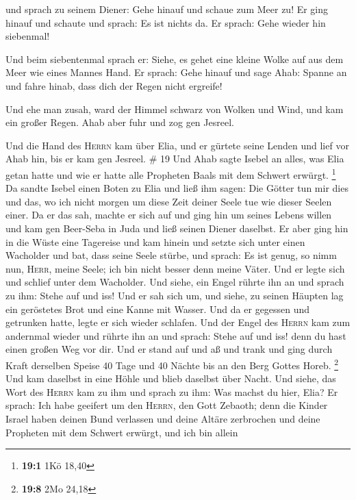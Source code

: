  und sprach zu seinem Diener: Gehe hinauf und schaue zum
Meer zu! Er ging hinauf und schaute und sprach: Es ist nichts da. Er
sprach: Gehe wieder hin siebenmal!

 Und beim siebentenmal sprach er: Siehe, es gehet eine
kleine Wolke auf aus dem Meer wie eines Mannes Hand. Er sprach: Gehe
hinauf und sage Ahab: Spanne an und fahre hinab, dass dich der Regen
nicht ergreife!

 Und ehe man zusah, ward der Himmel schwarz von Wolken
und Wind, und kam ein großer Regen. Ahab aber fuhr und zog gen Jesreel.

 Und die Hand des \textsc{Herrn} kam über Elia, und er
gürtete seine Lenden und lief vor Ahab hin, bis er kam gen Jesreel. \#
19  Und Ahab sagte Isebel an alles, was Elia getan hatte
und wie er hatte alle Propheten Baals mit dem Schwert erwürgt.
\footnote{\textbf{19:1} 1Kö 18,40}  Da sandte Isebel einen
Boten zu Elia und ließ ihm sagen: Die Götter tun mir dies und das, wo
ich nicht morgen um diese Zeit deiner Seele tue wie dieser Seelen einer.
 Da er das sah, machte er sich auf und ging hin um seines
Lebens willen und kam gen Beer-Seba in Juda und ließ seinen Diener
daselbst.  Er aber ging hin in die Wüste eine Tagereise
und kam hinein und setzte sich unter einen Wacholder und bat, dass seine
Seele stürbe, und sprach: Es ist genug, so nimm nun, \textsc{Herr},
meine Seele; ich bin nicht besser denn meine Väter.  Und
er legte sich und schlief unter dem Wacholder. Und siehe, ein Engel
rührte ihn an und sprach zu ihm: Stehe auf und iss!  Und
er sah sich um, und siehe, zu seinen Häupten lag ein geröstetes Brot und
eine Kanne mit Wasser. Und da er gegessen und getrunken hatte, legte er
sich wieder schlafen.  Und der Engel des \textsc{Herrn}
kam zum andernmal wieder und rührte ihn an und sprach: Stehe auf und
iss! denn du hast einen großen Weg vor dir.  Und er stand
auf und aß und trank und ging durch Kraft derselben Speise 40 Tage und
40 Nächte bis an den Berg Gottes Horeb. \footnote{\textbf{19:8} 2Mo
  24,18}  Und kam daselbst in eine Höhle und blieb
daselbst über Nacht. Und siehe, das Wort des \textsc{Herrn} kam zu ihm
und sprach zu ihm: Was machst du hier, Elia?  Er sprach:
Ich habe geeifert um den \textsc{Herrn}, den Gott Zebaoth; denn die
Kinder Israel haben deinen Bund verlassen und deine Altäre zerbrochen
und deine Propheten mit dem Schwert erwürgt, und ich bin allein
